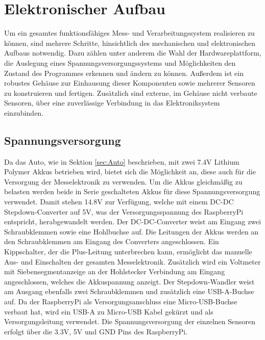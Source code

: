 \section{Elektronischer Aufbau}
\label{sec:Elektronik}
Um ein gesamtes funktionsfähiges Mess- und Verarbeitungssystem realisieren zu können, sind mehrere Schritte, hinsichtlich des mechanischen und elektronischen Aufbaus notwendig. Dazu zählen unter anderem die Wahl der Hardwareplattform, die Auslegung eines Spannungsversorgungssystems und Möglichkeiten den Zustand des Programmes erkennen und ändern zu können. Außerdem ist ein robustes Gehäuse zur Einhausung dieser Komponenten sowie mehrerer Sensoren zu konstruieren und fertigen. Zusätzlich sind externe, im Gehäuse nicht verbaute Sensoren, über eine zuverlässige Verbindung in das Elektroniksystem einzubinden.

\subsection{Spannungsversorgung}
\label{subsec:elekSupply}
Da das Auto, wie in Sektion \ref{sec:Auto} beschrieben, mit zwei 7.4\ac{V} Lithium Polymer Akkus betrieben wird, bietet sich die Möglichkeit an, diese auch für die Versorgung der Messelektronik zu verwenden. Um die Akkus gleichmäßig zu belasten werden beide in Serie geschalteten Akkus für diese Spannungsversorgung verwendet. Damit stehen 14.8\ac{V} zur Verfügung, welche mit einem DC-DC Stepdown-Converter auf 5\ac{V}, was der Versorgungsspannung des RaspberryPi entspricht, herabgewandelt werden. Der DC-DC-Converter weist am Eingang zwei Schraubklemmen sowie eine Hohlbuchse auf. Die Leitungen der Akkus werden an den Schraubklemmen am Eingang des Converters angeschlossen. Ein Kippschalter, der die Plus-Leitung unterbrechen kann, ermöglicht das manuelle Aus- und Einschalten der gesamten Messelektronik. Zusätzlich wird ein Voltmeter mit Siebensegmentanzeige an der Hohlstecker Verbindung am Eingang angeschlossen, welches die Akkuspannung anzeigt. Der Stepdown-Wandler weist am Ausgang ebenfalls zwei Schraubklemmen und zusätzlich eine \ac{USB}-A-Buchse auf. Da der RaspberryPi als Versorgungsanschluss eine Micro-\ac{USB}-Buchse verbaut hat, wird ein USB-A zu Micro-\ac{USB} Kabel gekürzt und als Versorgungsleitung verwendet. Die Spannungsversorgung der einzelnen Sensoren erfolgt über die 3.3\ac{V}, 5\ac{V} und GND Pins des RaspberryPi.

